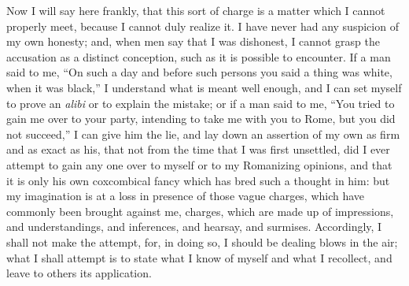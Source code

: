 Now I will say here frankly, that this sort of charge is a matter
which I cannot properly meet, because I cannot duly realize it. I have
never had any suspicion of my own honesty; and, when men say that I was
dishonest, I cannot grasp the accusation as a distinct conception, such
as it is possible to encounter. If a man said to me, ``On such a day
and before such persons you said a thing was white, when it was
black,'' I understand what is meant well enough, and I can set
myself to prove an \emph{alibi} or to explain the mistake; or if a man said to
me, ``You tried to gain me over to your party, intending to take me
with you to Rome, but you did not succeed,'' I can give him the lie,
and lay down an assertion of my own as firm and as exact as his, that
not from the time that I was first unsettled, did I ever attempt to gain
any one over to myself or to my Romanizing opinions, and that it
is only his own coxcombical fancy which has bred such a thought in him:
but my imagination is at a loss in presence of those vague charges,
which have commonly been brought against me, charges, which are made up
of impressions, and understandings, and inferences, and hearsay, and
surmises. Accordingly, I shall not make the attempt, for, in doing so, I
should be dealing blows in the air; what I shall attempt is to state
what I know of myself and what I recollect, and leave to
others its application.

